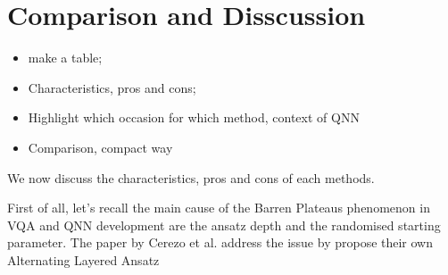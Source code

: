 \section{Comparison and Disscussion}
\begin{itemize}
    \item make a table;
    \item Characteristics, pros and cons;
    \item Highlight which occasion for which method, context of QNN
    \item Comparison, compact way
\end{itemize}

We now discuss the characteristics, pros and cons of each methods.

First of all, let's recall the main cause of the Barren Plateaus phenomenon in VQA and QNN development are the ansatz depth and the randomised starting parameter.
The paper \cite{cerezoCostFunctionDependent2021} by Cerezo et al. address the issue by propose their own Alternating Layered Ansatz